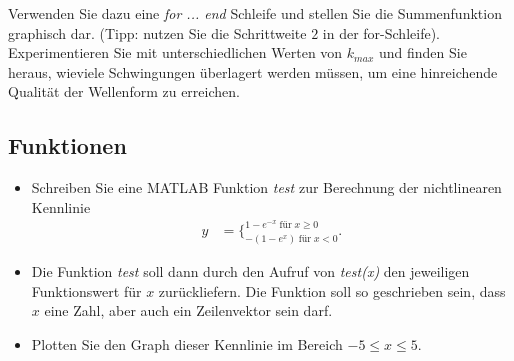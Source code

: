 Verwenden Sie dazu eine \emph{for ... end} Schleife und stellen Sie die Summenfunktion graphisch dar. (Tipp: nutzen Sie die Schrittweite $2$ in der for-Schleife). Experimentieren Sie mit unterschiedlichen Werten von $k_{max}$ und finden Sie heraus, wieviele Schwingungen überlagert werden müssen, um eine hinreichende Qualität der Wellenform zu erreichen.

\subsection{Funktionen}

\begin{itemize}
    \item Schreiben Sie eine MATLAB Funktion \emph{test} zur Berechnung der nichtlinearen Kennlinie
    \begin{align*}
        y &= \{_{-(1-e^x) \; \textrm{für} \; x<0}^{1-e^{-x} \; \textrm{für} \; x \geq 0}\textrm{.}
    \end{align*}
    \item Die Funktion \emph{test} soll dann durch den Aufruf von \emph{test(x)} den jeweiligen Funktionswert für $x$ zurückliefern. Die Funktion soll so geschrieben sein, dass $x$ eine Zahl, aber auch ein Zeilenvektor sein darf.
    \item Plotten Sie den Graph dieser Kennlinie im Bereich $-5 \leq x \leq 5$.
\end{itemize}
